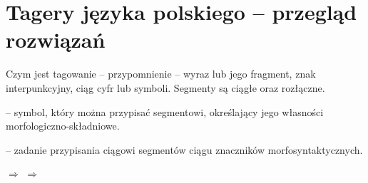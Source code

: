 \documentclass{beamer}
\begin{document}
\section{Tagery języka polskiego -- przegląd rozwiązań}
\frame{\sectionpage}

\begin{frame}{Czym jest tagowanie -- przypomnienie}
   -- wyraz lub jego fragment, znak interpunkcyjny, ciąg cyfr
lub symboli. Segmenty są ciągłe oraz rozłączne.
  \vspace{0.5cm}

   -- symbol, który można przypisać segmentowi, określający jego własności morfologiczno-składniowe.
  \vspace{0.5cm}

   -- zadanie przypisania ciągowi segmentów ciągu znaczników morfosyntaktycznych.
  \vspace{1cm}

   $\Rightarrow$  $\Rightarrow$ 
\end{frame}
\end{document}
